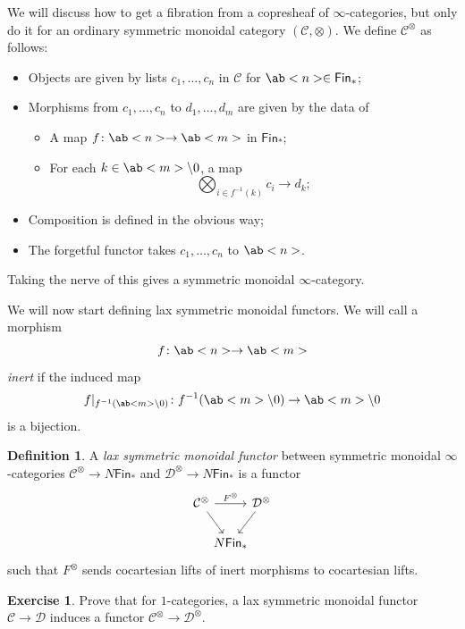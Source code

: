 \documentclass[10pt, oneside]{memoir}
\theoremstyle{definition}
\newtheorem{defn}[thm]{Definition}
\newtheorem{exer}[thm]{Exercise}
\theoremstyle{remark}
\theoremstyle{plain}
\theoremstyle{definition}
\theoremstyle{remark}
\newcommand{\mc}[1]{\mathcal{#1}}
\newcommand{\ms}[1]{\mathsf{#1}}
\newcommand{\1}{\mathbf{1}}
\newcommand{\2}{\mathbf{2}}
\newcommand{\3}{\mathbf{3}}
\begin{document}
We will discuss how to get a fibration from a copresheaf of \(\infty \)-categories, but only do it for an ordinary symmetric monoidal category \((\mc{C}, \otimes) \). We define \(\mc{C}^{\otimes} \) as follows:
\begin{itemize}
    \item Objects are given by lists \(c_1, \ldots, c_n \) in \(\mc{C} \) for \(\ab<n> \in \ms{Fin}_* \);
    \item Morphisms from \(c_1, \ldots, c_n \) to \(d_1, \ldots, d_m \) are given by the data of
    \begin{itemize}
        \item A map \(f \colon \ab<n> \to \ab<m> \) in \(\ms{Fin}_* \);
        \item For each \(k \in \ab<m> \setminus 0 \), a map
        \[ \bigotimes_{i \in f^{-1}(k)} c_i \to d_k; \]
    \end{itemize}
    \item Composition is defined in the obvious way;
    \item The forgetful functor takes \(c_1, \ldots, c_n \) to \(\ab<n> \).
\end{itemize}
Taking the nerve of this gives a symmetric monoidal \(\infty \)-category.

We will now start defining lax symmetric monoidal functors. We will call a morphism
\[ f \colon \ab<n> \to \ab<m> \]
\textit{inert} if the induced map
\[ f |_{f^{-1}(\ab<m> \setminus 0)} \colon f^{-1}(\ab<m> \setminus 0) \to \ab<m> \setminus 0 \]
is a bijection.

\begin{defn}
    A \textit{lax symmetric monoidal functor} between symmetric monoidal \(\infty \)-categories \(\mc{C}^{\otimes} \to N\ms{Fin}_* \) and \(\mc{D}^{\otimes} \to N\ms{Fin}_* \) is a functor
    \begin{equation*}
    \begin{tikzcd}[column sep=-0.5em]
        \mc{C}^{\otimes} \ar{rr}{F^{\otimes}} \ar{dr} & & \mc{D}^{\otimes} \ar{dl} \\
        & N\ms{Fin}_*
    \end{tikzcd}
    \end{equation*}
    such that \(F^{\otimes} \) sends cocartesian lifts of inert morphisms to cocartesian lifts.
\end{defn}

\begin{exer}
    Prove that for \(1 \)-categories, a lax symmetric monoidal functor \(\mc{C} \to \mc{D} \) induces a functor \(\mc{C}^{\otimes} \to \mc{D}^{\otimes} \).
\end{exer}
\end{document}
